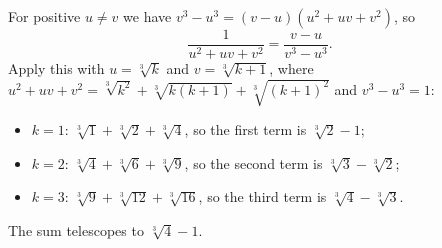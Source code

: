 For positive $u\ne v$ we have $v^3-u^3=(v-u)(u^2+uv+v^2)$, so
\[
\dfrac{1}{u^2+uv+v^2}=\dfrac{v-u}{v^3-u^3}.
\]
Apply this with $u=\sqrt[3]{k}$ and $v=\sqrt[3]{k+1}$, where $u^2+uv+v^2=\sqrt[3]{k^2}+\sqrt[3]{k(k+1)}+\sqrt[3]{(k+1)^2}$ and $v^3-u^3=1$:
\begin{itemize}
\item $k=1$: $\sqrt[3]{1}+\sqrt[3]{2}+\sqrt[3]{4}$, so the first term is $\sqrt[3]{2}-1$;
\item $k=2$: $\sqrt[3]{4}+\sqrt[3]{6}+\sqrt[3]{9}$, so the second term is $\sqrt[3]{3}-\sqrt[3]{2}$;
\item $k=3$: $\sqrt[3]{9}+\sqrt[3]{12}+\sqrt[3]{16}$, so the third term is $\sqrt[3]{4}-\sqrt[3]{3}$.
\end{itemize}
The sum telescopes to $\boxed{\sqrt[3]{4}-1}$.
